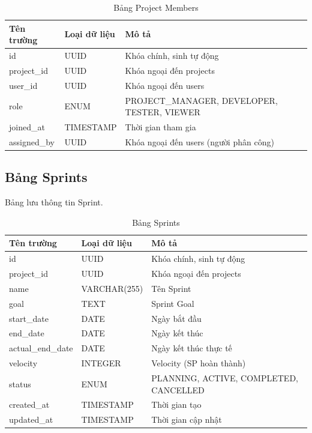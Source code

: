 \documentclass[12pt,a4paper]{report}
\begin{document}
\begin{table}[H]
\centering
\caption{Bảng Project Members}
\begin{tabular}{|p{4cm}|p{4cm}|p{7cm}|}
\hline
\textbf{Tên trường} & \textbf{Loại dữ liệu} & \textbf{Mô tả} \\
\hline
id & UUID & Khóa chính, sinh tự động \\
\hline
project\_id & UUID & Khóa ngoại đến projects \\
\hline
user\_id & UUID & Khóa ngoại đến users \\
\hline
role & ENUM & PROJECT\_MANAGER, DEVELOPER, TESTER, VIEWER \\
\hline
joined\_at & TIMESTAMP & Thời gian tham gia \\
\hline
assigned\_by & UUID & Khóa ngoại đến users (người phân công) \\
\hline
\end{tabular}
\label{tab:project_members_table}
\end{table}


\subsection{Bảng Sprints}

Bảng lưu thông tin Sprint.

\begin{table}[H]
\centering
\caption{Bảng Sprints}
\begin{tabular}{|p{4cm}|p{4cm}|p{7cm}|}
\hline
\textbf{Tên trường} & \textbf{Loại dữ liệu} & \textbf{Mô tả} \\
\hline
id & UUID & Khóa chính, sinh tự động \\
\hline
project\_id & UUID & Khóa ngoại đến projects \\
\hline
name & VARCHAR(255) & Tên Sprint \\
\hline
goal & TEXT & Sprint Goal \\
\hline
start\_date & DATE & Ngày bắt đầu \\
\hline
end\_date & DATE & Ngày kết thúc \\
\hline
actual\_end\_date & DATE & Ngày kết thúc thực tế \\
\hline
velocity & INTEGER & Velocity (SP hoàn thành) \\
\hline
status & ENUM & PLANNING, ACTIVE, COMPLETED, CANCELLED \\
\hline
created\_at & TIMESTAMP & Thời gian tạo \\
\hline
updated\_at & TIMESTAMP & Thời gian cập nhật \\
\hline
\end{tabular}
\label{tab:sprints_table}
\end{table}
\end{document}
